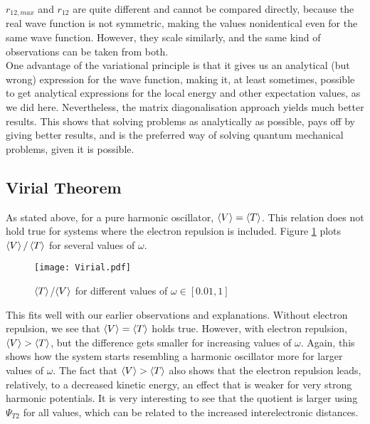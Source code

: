 \documentclass[10pt,a4paper]{article}
\begin{document}
$r_{12,max}$ and $r_{12}$ are quite different and cannot be compared directly, because the real wave function is not symmetric, making the values nonidentical even for the same wave function. However, they scale similarly, and the same kind of observations can be taken from both. \\
One advantage of the variational principle is that it gives us an analytical (but wrong) expression for the wave function, making it, at least sometimes, possible to get analytical expressions for the local energy and other expectation values, as we did here. Nevertheless, the matrix diagonalisation approach yields much better results. This shows that solving problems as analytically as possible, pays off by giving better results, and is the preferred way of solving quantum mechanical problems, given it is possible.  
\subsection{Virial Theorem}
As stated above, for a pure harmonic oscillator, $\braket{V}=\braket{T}$. This relation does not hold true for systems where the electron repulsion is included. Figure \ref{Virial} plots $\braket{V}/\braket{T}$ for several values of $\omega$.
\begin{figure}[H]
\centering
\texttt{[image: Virial.pdf]}\label{Virial}
\caption[$\braket{T}$/$0\braket{V}$ as function of $\omega$]{$\braket{T}$/$\braket{V}$ for different values of $\omega\in[0.01,1]$}
\end{figure}
This fits well with our earlier observations and explanations. Without electron repulsion, we see that $\braket{V}=\braket{T}$ holds true. However, with electron repulsion, $\braket{V}>\braket{T}$, but the difference gets smaller for increasing values of $\omega$. Again, this shows how the system starts resembling a harmonic oscillator more for larger values of $\omega$. The fact that $\braket{V}>\braket{T}$ also shows that the electron repulsion leads, relatively, to a decreased kinetic energy, an effect that is weaker for very strong harmonic potentials. It is very interesting to see that the quotient is larger using $\Psi_{T2}$ for all values, which can be related to the increased interelectronic distances. 
\end{document}
